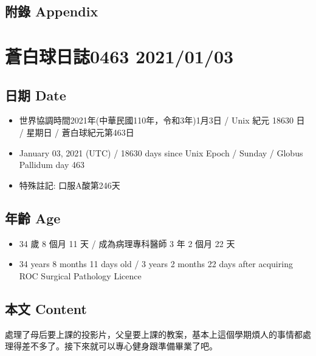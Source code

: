 \documentclass[a5paper, 10pt
]{book}
\providecommand{\tightlist}{%
  \setlength{\itemsep}{0pt}\setlength{\parskip}{0pt}}
\begin{document}
\hypertarget{ux9644ux9304-appendix-32}{%
\subsection{附錄 Appendix}\label{ux9644ux9304-appendix-32}}

\hypertarget{ux84bcux767dux7403ux65e5ux8a8c0463-20210103}{%
\section{蒼白球日誌0463
2021/01/03}\label{ux84bcux767dux7403ux65e5ux8a8c0463-20210103}}

\hypertarget{ux65e5ux671f-date-33}{%
\subsection{日期 Date}\label{ux65e5ux671f-date-33}}

\begin{itemize}
\tightlist
\item
  世界協調時間2021年(中華民國110年，令和3年)1月3日 / Unix 紀元 18630 日
  / 星期日 / 蒼白球紀元第463日
\item
  January 03, 2021 (UTC) / 18630 days since Unix Epoch / Sunday / Globus
  Pallidum day 463
\item
  特殊註記: 口服A酸第246天
\end{itemize}

\hypertarget{ux5e74ux9f61-age-33}{%
\subsection{年齡 Age}\label{ux5e74ux9f61-age-33}}

\begin{itemize}
\tightlist
\item
  34 歲 8 個月 11 天 / 成為病理專科醫師 3 年 2 個月 22 天
\item
  34 years 8 months 11 days old / 3 years 2 months 22 days after
  acquiring ROC Surgical Pathology Licence
\end{itemize}

\hypertarget{ux672cux6587-content-33}{%
\subsection{本文 Content}\label{ux672cux6587-content-33}}

處理了母后要上課的投影片，父皇要上課的教案，基本上這個學期煩人的事情都處理得差不多了。接下來就可以專心健身跟準備畢業了吧。
\end{document}
